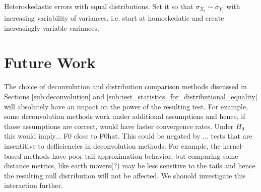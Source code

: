 \documentclass[12pt]{article}
\begin{document}
Heteroskedastic errors with equal distributions. Set it so that $\sigma_{X_i} \sim \sigma_{Y_j}$ with increasing variability of variances, i.e. start at homoskedatic and create increasingly variable variances. 








\section{Future Work} %
\label{sec:future_work}

The choice of deconvolution and distribution comparison methods discussed in Sections \ref{sub:deconvolution} and \ref{sub:test_statistics_for_distributional_equality} will absolutely have an impact on the power of the resulting test. For example, some deconvolution methods work under additional assumptions and hence, if those assumptions are correct, would have faster convergence rates. Under $H_0$ this would imply... F0 close to F0hat. This could be negated by ... tests that are insentitive to defficiencies in deconvolution methods. For example, the kernel-based methods have poor tail approximation behavior, but comparing some distance metrics, like earth movers(?) may be less sensitive to the tails and hence the resulting null distribution will not be affected. We shouold investigate this interaction further. 






\end{document}
